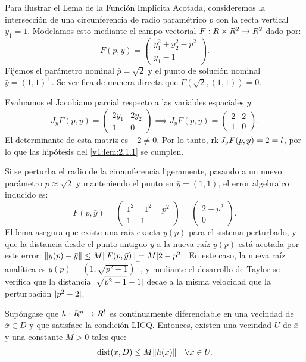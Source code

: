 \begin{example}\label{v1:exa:2.1.1}
 Para ilustrar el Lema de la Función Implícita Acotada, consideremos la intersección de una circunferencia de radio paramétrico $p$ con la recta vertical $y_1 = 1$. Modelamos esto mediante el campo vectorial $F : R \times R^2 \to R^2$ dado por:
 \[
 F(p, y) = \begin{pmatrix} y_1^2 + y_2^2 - p^2 \\ y_1 - 1 \end{pmatrix}.
 \]
 Fijemos el parámetro nominal $\bar{p} = \sqrt{2}$ y el punto de solución nominal $\bar{y} = (1, 1)^\top$. Se verifica de manera directa que $F(\sqrt{2}, (1,1)) = 0$.
 
 Evaluamos el Jacobiano parcial respecto a las variables espaciales $y$:
 \[
 J_y F(p, y) = \begin{pmatrix} 2y_1 & 2y_2 \\ 1 & 0 \end{pmatrix} \implies J_y F(\bar{p}, \bar{y})
 = \begin{pmatrix} 2 & 2 \\ 1 & 0 \end{pmatrix}.
 \]
 El determinante de esta matriz es $-2 \neq 0$. Por lo tanto, $\operatorname{rk} J_y F(\bar{p}, \bar{y}) = 2 = l$, por lo que las hipótesis del \cref{v1:lem:2.1.1} se cumplen.
 
 Si se perturba el radio de la circunferencia ligeramente, pasando a un nuevo parámetro $p \approx \sqrt{2}$ y manteniendo el punto en $\bar{y} = (1,1)$, el error algebraico inducido es:
 \[
 F(p, \bar{y}) = \begin{pmatrix} 1^2 + 1^2 - p^2 \\ 1 - 1 \end{pmatrix} = \begin{pmatrix} 2 - p^2 \\ 0 \end{pmatrix}.
 \]
 El lema asegura que existe una raíz exacta $y(p)$ para el sistema perturbado, y que la distancia desde el punto antiguo $\bar{y}$ a la nueva raíz $y(p)$ está acotada por este error: $\lVert y(p) - \bar{y}\rVert \le M \lVert F(p, \bar{y})\rVert = M \lvert2 - p^2\rvert$. En este caso, la nueva raíz analítica es $y(p) = (1, \sqrt{p^2 - 1})^\top$, y mediante el desarrollo de Taylor se verifica que la distancia $\lvert\sqrt{p^2 - 1} - 1\rvert$ decae a la misma velocidad que la perturbación $\lvert p^2 - 2\rvert$.
\end{example}

\begin{theorem}\label{v1:thm:2.1.1}
	Supóngase que $h : R^n \to R^l$ es continuamente diferenciable en una vecindad de $\bar{x} \in D$ y que satisface la condición LICQ. Entonces, existen una vecindad $U$ de $\bar{x}$ y una constante $M > 0$ tales que:
	\[
		\operatorname{dist}(x, D) \le M \lVert h(x)\rVert \quad \forall x \in U.
	\]
\end{theorem}

